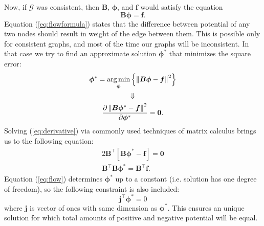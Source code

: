 \documentclass[lmodern, utf8, diplomski]{fer}
\newcommand{\matr}[1]{\mathbold{#1}}
\newcommand{\graph}[1]{\mathcal{#1}}
\newcommand{\T}{\top}
\DeclareMathOperator*{\argmin}{arg\min}
\begin{document}
  Now, if $\graph{G}$ was consistent, then $\matr{B}$, $\matr{\phi}$, and $\matr{f}$ would satisfy the equation
  \begin{equation}
  \label{eq:flowformula}
  \matr{B} \matr{\phi} = \matr{f}.
  \end{equation}
  Equation (\ref{eq:flowformula}) states that the difference between potential of any two nodes should result in weight of the edge between them.
  This is possible only for consistent graphs, and most of the time our graphs will be inconsistent.
  In that case we try to find an approximate solution $\matr{\phi^*}$ that minimizes the square error:
  \begin{gather}
  \matr{\phi^*} = \argmin_{\matr{\phi}} \left\{ \left \lVert \matr{B} \matr{\phi} - \matr{f}\textsl{} \right \rVert ^ 2 \right\} \nonumber \\ 
  \Downarrow \nonumber \\
  \label{eq:derivative}
  \frac{\partial \left \lVert \matr{B} \matr{\phi^*} - \matr{f} \right \rVert ^ 2}{\partial \matr{\phi^*}} = \mathbf{0}.
  \end{gather}
  Solving (\ref{eq:derivative}) via commonly used techniques of matrix calculus brings us to the following equation:
  \begin{gather}
  \label{eq:flow}
  2 \matr{B}^\T \left[\matr{B} \matr{\phi^*} - \matr{f} \right] = \mathbf{0} \nonumber \\
  \matr{B}^\T \matr{B} \matr{\phi^*} = \matr{B}^\T \matr{f}.
  \end{gather}
  Equation (\ref{eq:flow}) determines $\matr{\phi^*}$ up to a constant (i.e. solution has one degree of freedom), so the following constraint is also included:
  \begin{equation}
  \label{eq:sumiszero}
  \matr{j}^\T \matr{\phi^*} = 0
  \end{equation}
  where $\matr{j}$ is vector of ones with same dimension as $\matr{\phi^*}$.
  This ensures an unique solution for which total amounts of positive and negative potential will be equal.
  
\end{document}
